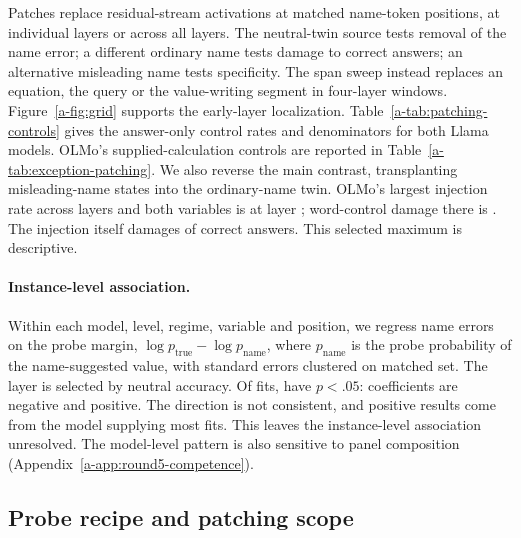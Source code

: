 Patches replace residual-stream activations at matched name-token positions, at individual
layers or across all layers. The neutral-twin source tests removal of the name error;
a different ordinary name tests damage to correct answers; an alternative misleading
name tests specificity. The span sweep instead replaces an equation, the query or the
value-writing segment in four-layer windows. Figure~\ref{a-fig:grid} supports the early-layer
localization. Table~\ref{a-tab:patching-controls} gives the answer-only control rates
and denominators for both Llama models.
OLMo's supplied-calculation controls are reported in Table~\ref{a-tab:exception-patching}.
We also reverse the main contrast, transplanting misleading-name states into the
ordinary-name twin. OLMo's largest injection rate across layers and both variables is
 at layer ; word-control damage there is
. The injection itself damages  of correct
answers. This selected maximum is descriptive.

\begin{table}[t]
\centering\small
\resizebox{\textwidth}{!}{}
\caption{All-layer answer-only patches, demonstration set 7. Neutral and alternative:
percentage of baseline name errors removed. Word damage: percentage of correct
ordinary-name answers changed; \emph{Correct} gives that denominator.}
\label{a-tab:patching-controls}
\end{table}

\paragraph{Instance-level association.} Within each model, level, regime, variable and
position, we regress name errors on the probe margin, $\log p_{\mathrm{true}}-\log p_{\mathrm{name}}$,
where $p_{\mathrm{name}}$ is the probe probability of the name-suggested value,
with standard errors clustered on matched set. The layer is selected by neutral accuracy.
Of  fits,  have $p<.05$:  coefficients are negative
and  positive. The direction is not consistent, and 
positive results come from the model supplying most fits. This leaves the instance-level
association unresolved. The model-level pattern is also sensitive to panel composition
(Appendix~\ref{a-app:round5-competence}).

\subsection{Probe recipe and patching scope}

